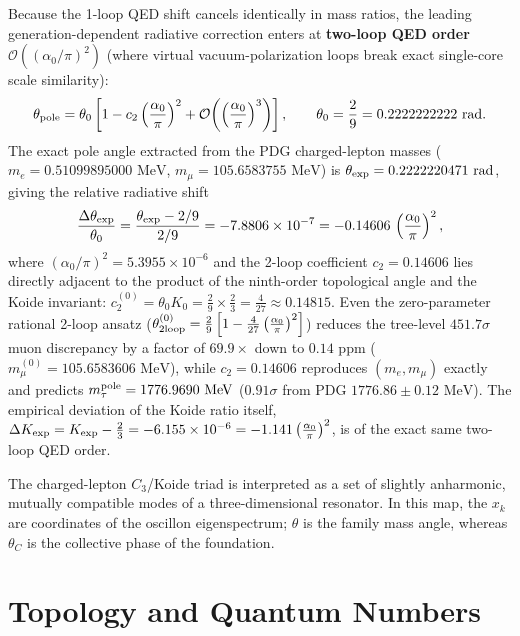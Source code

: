 \documentclass[11pt,a4paper]{article}
\begin{document}
Because the 1-loop QED shift cancels identically in mass ratios, the leading generation-dependent radiative correction enters at \textbf{two-loop QED order} $\mathcal{O}\!\left((\alpha_0/\pi)^2\right)$ (where virtual vacuum-polarization loops break exact single-core scale similarity):
\begin{equation}
\theta_{\rm pole} = \theta_0\left[1 - c_2\left(\frac{\alpha_0}{\pi}\right)^2 + \mathcal{O}\!\left(\left(\frac{\alpha_0}{\pi}\right)^3\right)\right], \qquad \theta_0 = \frac{2}{9} = 0.2222222222\text{ rad}.
\end{equation}
The exact pole angle extracted from the PDG charged-lepton masses ($m_e = 0.51099895000\text{ MeV}$, $m_\mu = 105.6583755\text{ MeV}$) is $\theta_{\rm exp} = 0.2222220471\text{ rad}$, giving the relative radiative shift
\begin{equation}
\frac{\Delta\theta_{\rm exp}}{\theta_0} = \frac{\theta_{\rm exp} - 2/9}{2/9} = -7.8806\times 10^{-7} = -0.14606\,\left(\frac{\alpha_0}{\pi}\right)^2,
\end{equation}
where $(\alpha_0/\pi)^2 = 5.3955\times 10^{-6}$ and the 2-loop coefficient $c_2 = 0.14606$ lies directly adjacent to the product of the ninth-order topological angle and the Koide invariant: $c_2^{(0)} = \theta_0 K_0 = \frac{2}{9}\times\frac{2}{3} = \frac{4}{27} \approx 0.14815$. Even the zero-parameter rational 2-loop ansatz ($\theta_{2{\rm loop}}^{(0)} = \frac{2}{9}\left[1 - \frac{4}{27}\left(\frac{\alpha_0}{\pi}\right)^2\right]$) reduces the tree-level $451.7\sigma$ muon discrepancy by a factor of $69.9\times$ down to $0.14\text{ ppm}$ ($m_\mu^{(0)} = 105.6583606\text{ MeV}$), while $c_2 = 0.14606$ reproduces $(m_e, m_\mu)$ exactly and predicts $m_\tau^{\rm pole} = 1776.9690\text{ MeV}$ ($0.91\sigma$ from PDG $1776.86 \pm 0.12\text{ MeV}$). The empirical deviation of the Koide ratio itself, $\Delta K_{\rm exp} = K_{\rm exp} - \frac{2}{3} = -6.155\times 10^{-6} = -1.141\left(\frac{\alpha_0}{\pi}\right)^2$, is of the exact same two-loop QED order.

The charged-lepton $C_3$/Koide triad is interpreted as a set of slightly anharmonic, mutually compatible modes of a three-dimensional resonator. In this map, the $x_k$ are coordinates of the oscillon eigenspectrum; $\theta$ is the family mass angle, whereas $\theta_C$ is the collective phase of the foundation.

\section{Topology and Quantum Numbers}
\end{document}
